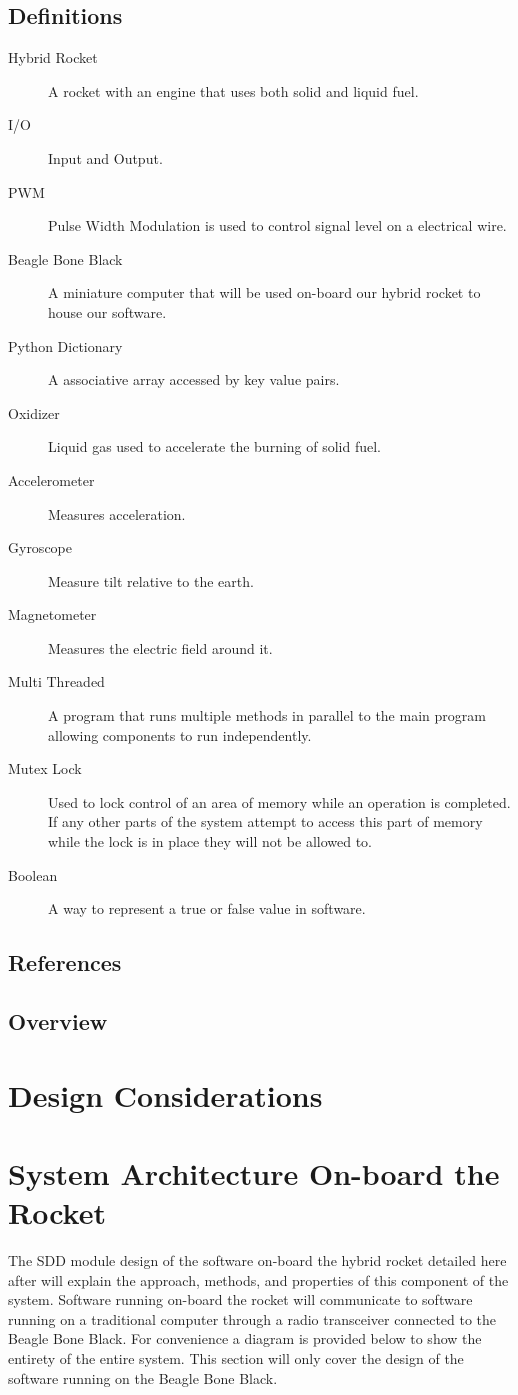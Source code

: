 \documentclass[10pt,draftclsnofoot,onecolumn,compsoc]{IEEEtran}
\begin{document}
\subsection{Definitions}
\begin{description}
	\item[Hybrid Rocket] A rocket with an engine that uses both solid and liquid fuel.
	\item[I/O] Input and Output.
	\item[PWM] Pulse Width Modulation is used to control signal level on a electrical wire.
	\item[Beagle Bone Black] A miniature computer that will be used on-board our hybrid rocket to house our software.
	\item[Python Dictionary] A associative array accessed by key value pairs.
	\item[Oxidizer] Liquid gas used to accelerate the burning of solid fuel.
	\item[Accelerometer] Measures acceleration.
	\item[Gyroscope] Measure tilt relative to the earth.
	\item[Magnetometer] Measures the electric field around it.
	\item[Multi Threaded] A program that runs multiple methods in parallel to the main program allowing components to run independently.
	\item[Mutex Lock] Used to lock control of an area of memory while an operation is completed. If any other parts of the system attempt to access this part of memory while the lock is in place they will not be allowed to.
	\item[Boolean] A way to represent a true or false value in software.
\end{description}
\subsection{References}
\subsection{Overview}
\section{Design Considerations}
\section{System Architecture On-board the Rocket }	
The SDD module design of the software on-board the hybrid rocket detailed here after will explain the approach, methods, and properties of this component of the system. Software running on-board the rocket will communicate to software running on a traditional computer through a radio transceiver connected to the Beagle Bone Black. For convenience a diagram is provided below to show the entirety of the entire system. This section will  only cover the design of the software running on the Beagle Bone Black. \par
\end{document}
